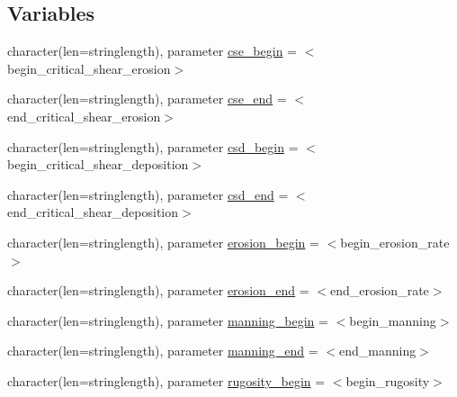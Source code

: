 \subsection*{Variables}
\begin{DoxyCompactItemize}
\item 
character(len=stringlength), parameter \mbox{\hyperlink{namespacemoduleinterfacesedimentwater_a8a2e2d91de512377ff662127855dca5c}{cse\+\_\+begin}} = \textquotesingle{}$<$begin\+\_\+critical\+\_\+shear\+\_\+erosion$>$\textquotesingle{}
\item 
character(len=stringlength), parameter \mbox{\hyperlink{namespacemoduleinterfacesedimentwater_a80a2efdf5ac61c5cc429f5e61c6ef6d4}{cse\+\_\+end}} = \textquotesingle{}$<$end\+\_\+critical\+\_\+shear\+\_\+erosion$>$\textquotesingle{}
\item 
character(len=stringlength), parameter \mbox{\hyperlink{namespacemoduleinterfacesedimentwater_a2d30cd676cd88044ba1e401fea344d71}{csd\+\_\+begin}} = \textquotesingle{}$<$begin\+\_\+critical\+\_\+shear\+\_\+deposition$>$\textquotesingle{}
\item 
character(len=stringlength), parameter \mbox{\hyperlink{namespacemoduleinterfacesedimentwater_ab4681bf40a9030287a7b3487a734cc61}{csd\+\_\+end}} = \textquotesingle{}$<$end\+\_\+critical\+\_\+shear\+\_\+deposition$>$\textquotesingle{}
\item 
character(len=stringlength), parameter \mbox{\hyperlink{namespacemoduleinterfacesedimentwater_abea11c747919e453084a12286b21882e}{erosion\+\_\+begin}} = \textquotesingle{}$<$begin\+\_\+erosion\+\_\+rate$>$\textquotesingle{}
\item 
character(len=stringlength), parameter \mbox{\hyperlink{namespacemoduleinterfacesedimentwater_a3cb4b5cf7ff53feece75ccaee001fca9}{erosion\+\_\+end}} = \textquotesingle{}$<$end\+\_\+erosion\+\_\+rate$>$\textquotesingle{}
\item 
character(len=stringlength), parameter \mbox{\hyperlink{namespacemoduleinterfacesedimentwater_a660a5cd15ce4aae073a332efcee6c90c}{manning\+\_\+begin}} = \textquotesingle{}$<$begin\+\_\+manning$>$\textquotesingle{}
\item 
character(len=stringlength), parameter \mbox{\hyperlink{namespacemoduleinterfacesedimentwater_a8e67f5acac1750fb6b898ad1f03f512a}{manning\+\_\+end}} = \textquotesingle{}$<$end\+\_\+manning$>$\textquotesingle{}
\item 
character(len=stringlength), parameter \mbox{\hyperlink{namespacemoduleinterfacesedimentwater_af85e95b969ff985f2fefcabb3ac4782c}{rugosity\+\_\+begin}} = \textquotesingle{}$<$begin\+\_\+rugosity$>$\textquotesingle{}

\end{DoxyCompactItemize}
